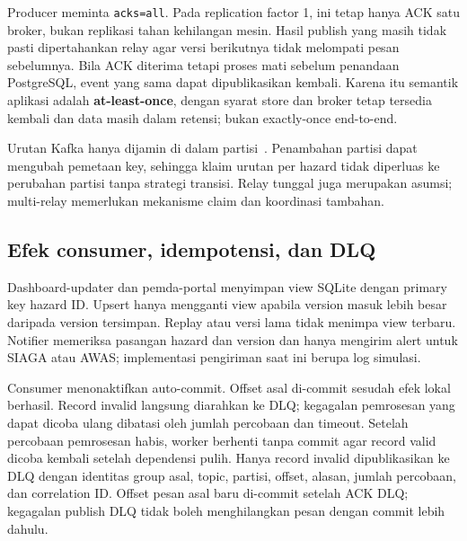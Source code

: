 Producer meminta \texttt{acks=all}. Pada replication factor 1, ini tetap hanya ACK satu broker, bukan replikasi tahan kehilangan mesin. Hasil publish yang masih tidak pasti dipertahankan relay agar versi berikutnya tidak melompati pesan sebelumnya. Bila ACK diterima tetapi proses mati sebelum penandaan PostgreSQL, event yang sama dapat dipublikasikan kembali. Karena itu semantik aplikasi adalah \textbf{at-least-once}, dengan syarat store dan broker tetap tersedia kembali dan data masih dalam retensi; bukan exactly-once end-to-end.

Urutan Kafka hanya dijamin di dalam partisi~\cite{kafka-semantics}. Penambahan partisi dapat mengubah pemetaan key, sehingga klaim urutan per hazard tidak diperluas ke perubahan partisi tanpa strategi transisi. Relay tunggal juga merupakan asumsi; multi-relay memerlukan mekanisme claim dan koordinasi tambahan.

\subsection{Efek consumer, idempotensi, dan DLQ}
Dashboard-updater dan pemda-portal menyimpan view SQLite dengan primary key hazard ID. Upsert hanya mengganti view apabila version masuk lebih besar daripada version tersimpan. Replay atau versi lama tidak menimpa view terbaru. Notifier memeriksa pasangan hazard dan version dan hanya mengirim alert untuk SIAGA atau AWAS; implementasi pengiriman saat ini berupa log simulasi.



Consumer menonaktifkan auto-commit. Offset asal di-commit sesudah efek lokal berhasil. Record invalid langsung diarahkan ke DLQ; kegagalan pemrosesan yang dapat dicoba ulang dibatasi oleh jumlah percobaan dan timeout. Setelah percobaan pemrosesan habis, worker berhenti tanpa commit agar record valid dicoba kembali setelah dependensi pulih. Hanya record invalid dipublikasikan ke DLQ dengan identitas group asal, topic, partisi, offset, alasan, jumlah percobaan, dan correlation ID. Offset pesan asal baru di-commit setelah ACK DLQ; kegagalan publish DLQ tidak boleh menghilangkan pesan dengan commit lebih dahulu.

